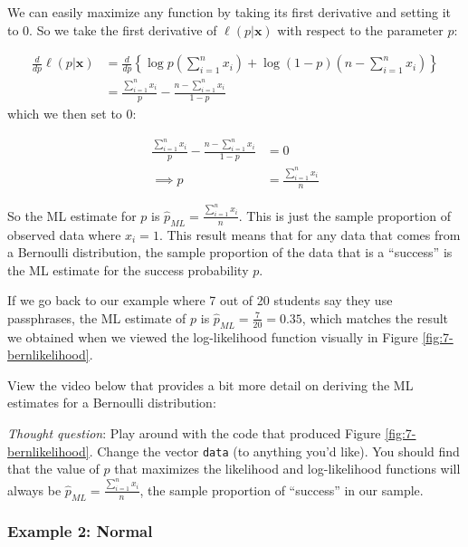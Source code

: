 \documentclass[
]{book}
\begin{document}
We can easily maximize any function by taking its first derivative and setting it to 0. So we take the first derivative of \(\ell (p | \boldsymbol{x})\) with respect to the parameter \(p\):

\[
\begin{split}
\frac{d}{d p}\ell (p | \boldsymbol{x}) &= \frac{d}{d p} \left\{ \log p \left(\sum_{i=1}^n x_i \right) + \log (1-p) \left( n - \sum_{i=1}^n x_i \right) \right\}\\
                          &= \frac{\sum_{i=1}^n x_i}{p} - \frac{n - \sum_{i=1}^n x_i}{1-p}
\end{split}
\]
which we then set to 0:

\[
\begin{split}
\frac{\sum_{i=1}^n x_i}{p} - \frac{n - \sum_{i=1}^n x_i}{1-p} &= 0\\
                                               \implies p     &= \frac{\sum_{i=1}^n x_i}{n}
\end{split}
\]

So the ML estimate for \(p\) is \(\hat{p}_{ML} = \frac{\sum_{i=1}^n x_i}{n}\). This is just the sample proportion of observed data where \(x_i = 1\). This result means that for any data that comes from a Bernoulli distribution, the sample proportion of the data that is a ``success'' is the ML estimate for the success probability \(p\).

If we go back to our example where 7 out of 20 students say they use passphrases, the ML estimate of \(p\) is \(\hat{p}_{ML} = \frac{7}{20} = 0.35\), which matches the result we obtained when we viewed the log-likelihood function visually in Figure \ref{fig:7-bernlikelihood}.

View the video below that provides a bit more detail on deriving the ML estimates for a Bernoulli distribution:

\emph{Thought question}: Play around with the code that produced Figure \ref{fig:7-bernlikelihood}. Change the vector \texttt{data} (to anything you'd like). You should find that the value of \(p\) that maximizes the likelihood and log-likelihood functions will always be \(\hat{p}_{ML} = \frac{\sum_{i=1}^n x_i}{n}\), the sample proportion of ``success'' in our sample.

\hypertarget{example-2-normal-1}{%
\subsubsection{Example 2: Normal}\label{example-2-normal-1}}
\end{document}
